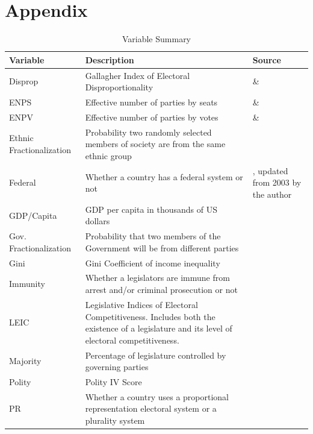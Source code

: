 \documentclass[a4paper]{article}\usepackage[]{graphicx}\usepackage[]{color}
\begin{document}
\clearpage
\section*{Appendix}


\begin{table}[!h]
    \begin{center}
    \caption{Variable Summary}
    \label{var_summary}
    \begin{tabular}{l m{7cm} m{3.5cm}}

            \hline
            Variable & Description & Source \\
            \hline \hline
            Disprop & Gallagher Index of Electoral Disproportionality & \cite{Gallagher2012} \& \cite{Carey2011} \\
            ENPS & Effective number of parties by seats & \cite{Gallagher2012} \& \cite{Carey2011} \\
            ENPV & Effective number of parties by votes & \cite{Gallagher2012} \& \cite{Carey2011} \\
            Ethnic Fractionalization & Probability two randomly selected members of society are from the same ethnic group & \cite{Alesina2003} \\
            Federal & Whether a country has a federal system or not & \cite{Carey2011}, updated from 2003 by the author \\           
            GDP/Capita & GDP per capita in thousands of US dollars & \cite{WorldBank2011} \\
            Gov. Fractionalization & Probability that two members of the Government will be from different parties & \cite{DPI2001} \\
            Gini & Gini Coefficient of income inequality & \cite{UNU2008} \\
            Immunity & Whether a legislators are immune from arrest and/or criminal prosecution or not & \cite{Fish2009} \\
            LEIC & Legislative Indices of Electoral Competitiveness. Includes both the existence of a legislature and its level of electoral competitiveness. & \cite{DPI2001} \\
            Majority & Percentage of legislature controlled by governing parties & \cite{DPI2001} \\
            Polity & Polity IV Score & \cite{Marshall2009} \\
            PR & Whether a country uses a proportional representation electoral system or a plurality system & \cite{DPI2001} \\

\end{tabular}
\end{center}
\end{table}
\end{document}
